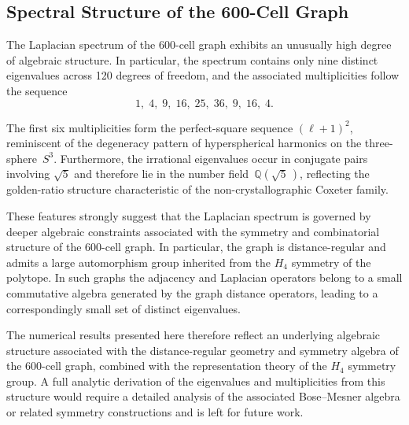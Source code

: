 \documentclass[12pt,a4paper]{article}
\newcommand{\Hfour}{H_4}
\newcommand{\Q}{\mathbb{Q}}
\begin{document}
\subsection{Spectral Structure of the 600-Cell Graph}

The Laplacian spectrum of the 600-cell graph exhibits an
unusually high degree of algebraic structure.  In particular,
the spectrum contains only nine distinct eigenvalues across
120 degrees of freedom, and the associated multiplicities
follow the sequence
\[
1,\;4,\;9,\;16,\;25,\;36,\;9,\;16,\;4.
\]

The first six multiplicities form the perfect-square sequence
$(\ell+1)^2$, reminiscent of the degeneracy pattern of
hyperspherical harmonics on the three-sphere~$S^3$.
Furthermore, the irrational eigenvalues occur in conjugate
pairs involving $\sqrt{5}$ and therefore lie in the number
field~$\Q(\sqrt{5}\,)$, reflecting the golden-ratio
structure characteristic of the non-crystallographic Coxeter
family.

These features strongly suggest that the Laplacian spectrum
is governed by deeper algebraic constraints associated with
the symmetry and combinatorial structure of the 600-cell
graph.  In particular, the graph is distance-regular and
admits a large automorphism group inherited from the
$\Hfour$ symmetry of the polytope.  In such graphs the
adjacency and Laplacian operators belong to a small
commutative algebra generated by the graph distance
operators, leading to a correspondingly small set of
distinct eigenvalues.

The numerical results presented here therefore reflect
an underlying algebraic structure associated with the
distance-regular geometry and symmetry algebra of the 600-cell
graph, combined with the representation theory of the $\Hfour$
symmetry group.  A full analytic derivation
of the eigenvalues and multiplicities from this structure
would require a detailed analysis of the associated
Bose--Mesner algebra or related symmetry constructions and
is left for future work.
\end{document}
